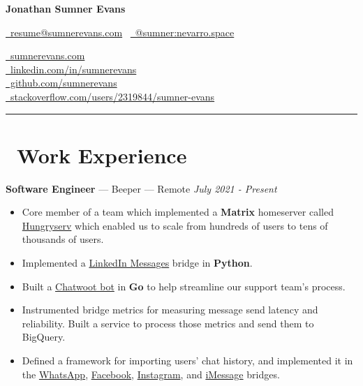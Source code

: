 \documentclass[10pt,letterpaper]{article}
\begin{document}
\begin{minipage}[b][][b]{0.5\linewidth}
    {\huge\textbf{Jonathan Sumner Evans}}

    \vspace{5pt}
    \href{mailto:resume@sumnerevans.com}{\faEnvelope\ resume@sumnerevans.com}
    \textbar\ \href{https://matrix.to/#/@sumner:nevarro.space}{\faMatrixOrg\ @sumner:nevarro.space}
\end{minipage}\hfill
\begin{minipage}[b][][b]{0.45\linewidth}
    \href{https://sumnerevans.com}{\faGlobe\ sumnerevans.com} \\
    \href{https://www.linkedin.com/in/sumnerevans}{\faLinkedin\ linkedin.com/in/sumnerevans} \\
    \href{https://github.com/sumnerevans}{\faGithub\ github.com/sumnerevans} \\
    \href{https://stackoverflow.com/users/2319844/sumner-evans}{\faStackOverflow\ stackoverflow.com/users/2319844/sumner-evans}
\end{minipage}
\rule{\textwidth}{0.5pt}

\section*{\faBriefcase\ Work Experience}
\textbf{Software Engineer} --- Beeper --- Remote
\hfill \textit{July 2021 - Present}
\begin{itemize}
    \item Core member of a team which implemented a \textbf{Matrix} homeserver
        called
        \href{https://github.com/sumnerevans/hungryserv-presentation}{Hungryserv}
        which enabled us to scale from hundreds of users to tens of thousands of
        users.
    \item Implemented a \href{https://github.com/beeper/linkedin}{LinkedIn
        Messages} bridge in \textbf{Python}.
    \item Built a \href{https://github.com/beeper/chatwoot}{Chatwoot bot} in
        \textbf{Go} to help streamline our support team's process.
    \item Instrumented bridge metrics for measuring message send latency and
        reliability. Built a service to process those metrics and send them to
        BigQuery.
    \item Defined a framework for importing users' chat history, and
        implemented it in the
        \href{https://github.com/mautrix/whatsapp}{WhatsApp},
        \href{https://github.com/mautrix/facebook}{Facebook},
        \href{https://github.com/mautrix/instagram}{Instagram}, and
        \href{https://github.com/mautrix/imessage}{iMessage} bridges.
\end{itemize}
\end{document}
